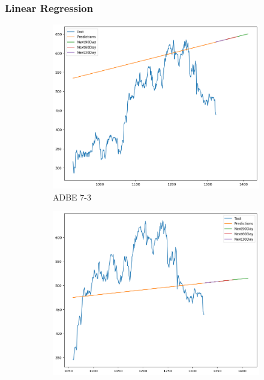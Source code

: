 \documentclass{ieeeojies}
\begin{document}
\subsubsection{Linear Regression}
\begin{figure}[H]
    \begin{subfigure}{0.33\linewidth}
        \centering
        \includegraphics[width=\linewidth]{Linear Plot/ADBE_Linear Regression_7_3.png}
        \caption{ADBE 7-3}
        \label{fig:adbe-7-3}
    \end{subfigure}%
    \hfill
    \begin{subfigure}{0.33\linewidth}
        \centering
        \includegraphics[width=\linewidth]{Linear Plot/ADBE_Linear Regression_8_2.png}

\end{subfigure}
\end{figure}
\end{document}
